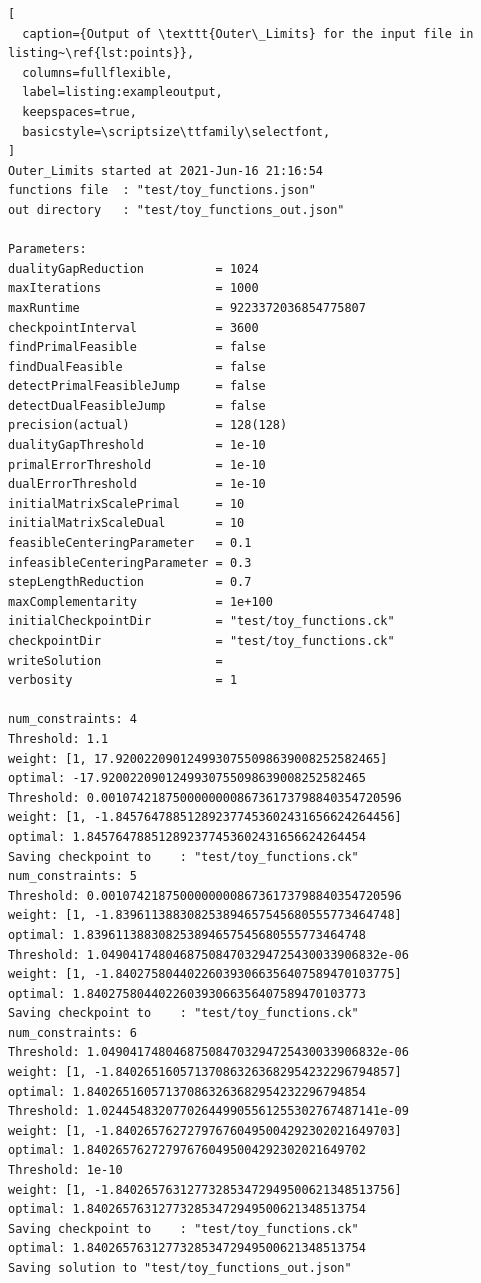 \documentclass[12pt]{article}
\numberwithin{equation}{section}
\begin{document}
\begin{lstlisting}[
  caption={Output of \texttt{Outer\_Limits} for the input file in listing~\ref{lst:points}},
  columns=fullflexible,
  label=listing:exampleoutput,
  keepspaces=true,
  basicstyle=\scriptsize\ttfamily\selectfont,
]
Outer_Limits started at 2021-Jun-16 21:16:54
functions file  : "test/toy_functions.json"
out directory   : "test/toy_functions_out.json"

Parameters:
dualityGapReduction          = 1024
maxIterations                = 1000
maxRuntime                   = 9223372036854775807
checkpointInterval           = 3600
findPrimalFeasible           = false
findDualFeasible             = false
detectPrimalFeasibleJump     = false
detectDualFeasibleJump       = false
precision(actual)            = 128(128)
dualityGapThreshold          = 1e-10
primalErrorThreshold         = 1e-10
dualErrorThreshold           = 1e-10
initialMatrixScalePrimal     = 10
initialMatrixScaleDual       = 10
feasibleCenteringParameter   = 0.1
infeasibleCenteringParameter = 0.3
stepLengthReduction          = 0.7
maxComplementarity           = 1e+100
initialCheckpointDir         = "test/toy_functions.ck"
checkpointDir                = "test/toy_functions.ck"
writeSolution                = 
verbosity                    = 1

num_constraints: 4
Threshold: 1.1
weight: [1, 17.9200220901249930755098639008252582465]
optimal: -17.9200220901249930755098639008252582465
Threshold: 0.001074218750000000086736173798840354720596
weight: [1, -1.845764788512892377453602431656624264456]
optimal: 1.845764788512892377453602431656624264454
Saving checkpoint to    : "test/toy_functions.ck"
num_constraints: 5
Threshold: 0.001074218750000000086736173798840354720596
weight: [1, -1.839611388308253894657545680555773464748]
optimal: 1.839611388308253894657545680555773464748
Threshold: 1.049041748046875084703294725430033906832e-06
weight: [1, -1.840275804402260393066356407589470103775]
optimal: 1.840275804402260393066356407589470103773
Saving checkpoint to    : "test/toy_functions.ck"
num_constraints: 6
Threshold: 1.049041748046875084703294725430033906832e-06
weight: [1, -1.840265160571370863263682954232296794857]
optimal: 1.840265160571370863263682954232296794854
Threshold: 1.024454832077026449905561255302767487141e-09
weight: [1, -1.840265762727976760495004292302021649703]
optimal: 1.840265762727976760495004292302021649702
Threshold: 1e-10
weight: [1, -1.840265763127732853472949500621348513756]
optimal: 1.840265763127732853472949500621348513754
Saving checkpoint to    : "test/toy_functions.ck"
optimal: 1.840265763127732853472949500621348513754
Saving solution to "test/toy_functions_out.json"
\end{lstlisting}
\end{document}
